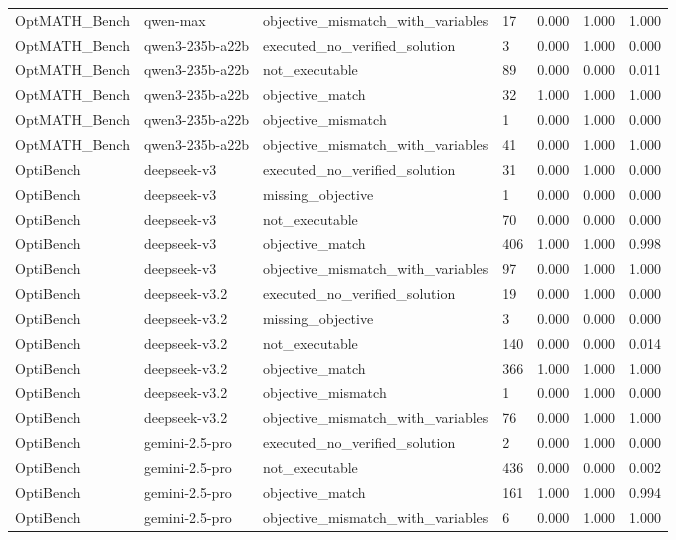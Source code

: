 \begin{table}[t]
\begin{tabular}{lllllll}
OptMATH\_Bench & qwen-max & objective\_mismatch\_with\_variables & 17 & 0.000 & 1.000 & 1.000 \\
OptMATH\_Bench & qwen3-235b-a22b & executed\_no\_verified\_solution & 3 & 0.000 & 1.000 & 0.000 \\
OptMATH\_Bench & qwen3-235b-a22b & not\_executable & 89 & 0.000 & 0.000 & 0.011 \\
OptMATH\_Bench & qwen3-235b-a22b & objective\_match & 32 & 1.000 & 1.000 & 1.000 \\
OptMATH\_Bench & qwen3-235b-a22b & objective\_mismatch & 1 & 0.000 & 1.000 & 0.000 \\
OptMATH\_Bench & qwen3-235b-a22b & objective\_mismatch\_with\_variables & 41 & 0.000 & 1.000 & 1.000 \\
OptiBench & deepseek-v3 & executed\_no\_verified\_solution & 31 & 0.000 & 1.000 & 0.000 \\
OptiBench & deepseek-v3 & missing\_objective & 1 & 0.000 & 0.000 & 0.000 \\
OptiBench & deepseek-v3 & not\_executable & 70 & 0.000 & 0.000 & 0.000 \\
OptiBench & deepseek-v3 & objective\_match & 406 & 1.000 & 1.000 & 0.998 \\
OptiBench & deepseek-v3 & objective\_mismatch\_with\_variables & 97 & 0.000 & 1.000 & 1.000 \\
OptiBench & deepseek-v3.2 & executed\_no\_verified\_solution & 19 & 0.000 & 1.000 & 0.000 \\
OptiBench & deepseek-v3.2 & missing\_objective & 3 & 0.000 & 0.000 & 0.000 \\
OptiBench & deepseek-v3.2 & not\_executable & 140 & 0.000 & 0.000 & 0.014 \\
OptiBench & deepseek-v3.2 & objective\_match & 366 & 1.000 & 1.000 & 1.000 \\
OptiBench & deepseek-v3.2 & objective\_mismatch & 1 & 0.000 & 1.000 & 0.000 \\
OptiBench & deepseek-v3.2 & objective\_mismatch\_with\_variables & 76 & 0.000 & 1.000 & 1.000 \\
OptiBench & gemini-2.5-pro & executed\_no\_verified\_solution & 2 & 0.000 & 1.000 & 0.000 \\
OptiBench & gemini-2.5-pro & not\_executable & 436 & 0.000 & 0.000 & 0.002 \\
OptiBench & gemini-2.5-pro & objective\_match & 161 & 1.000 & 1.000 & 0.994 \\
OptiBench & gemini-2.5-pro & objective\_mismatch\_with\_variables & 6 & 0.000 & 1.000 & 1.000 \\

\end{tabular}
\end{table}
